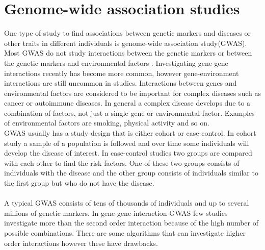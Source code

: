 \documentclass[10pt,a4paper]{report}
\begin{document}
\section{Genome-wide association studies}
One type of study to find associations between genetic markers and diseases or other traits in different individuals is genome-wide association study(GWAS). Most GWAS do not study interactions between the genetic markers or between the genetic markers and environmental factors \cite{cordell_detect_review, gene_enviroment_2013}. Investigating gene-gene interactions recently has become more common\cite{cordell_detect_review}, however gene-environment interactions are still uncommon in studies\cite{gene_enviroment_2013}. Interactions between genes and environmental factors are considered to be important for complex diseases such as cancer or autoimmune diseases\cite{cordell_detect_review, gene_enviroment_2013, geira, ra_smoking}. In general a complex disease develops due to a combination of factors, not just a single gene or environmental factor\cite{rothman2008modern}. Examples of environmental factors are smoking, physical activity and so on.
\\
GWAS usually has a study design that is either cohort or case-control\cite{rothman2008modern}. In cohort study a sample of a population is followed and over time some individuals will develop the disease of interest\cite{mann_observational}. In case-control studies two groups are compared with each other to find the risk factors\cite{mann_observational}. One of these two groups consists of individuals with the disease and the other group consists of individuals similar to the first group but who do not have the disease\cite{mann_observational}.\\
\\
A typical GWAS consists of tens of thousands of individuals and up to several millions of genetic markers\cite{cordell_detect_review, burton2007genome}. In gene-gene interaction GWAS   few studies investigate more than the second order interaction because of the high number of possible combinations. There are some algorithms that can investigate higher order interactions however these have drawbacks\cite{gwis,high_order_2012,fast_high_order_cluster}.

\end{document}
